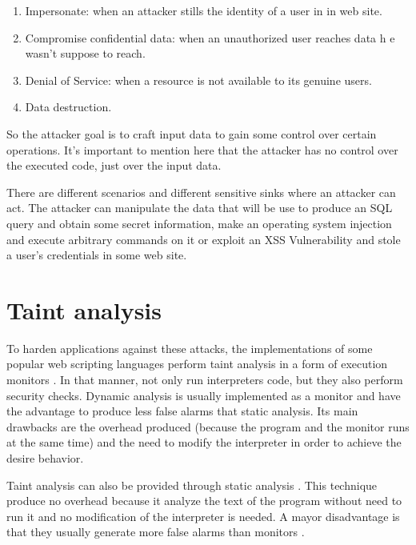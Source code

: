 \begin{enumerate}
\item Impersonate: when an attacker stills the identity of a user
in in web site.
\item Compromise confidential data: when an unauthorized user
reaches data h
e wasn't suppose to reach.
\item Denial of Service: when a resource is not available
to its genuine users.
\item Data destruction.
\end{enumerate}

So the attacker goal is to craft input data to gain some
control over certain operations.
It's important to mention here that the attacker has no
control over the executed code,
just over the input data.

There are different scenarios and different sensitive sinks
where an attacker can act.
The attacker can  manipulate the data that will be use
to produce an SQL query
and obtain some secret information,
make an operating system injection and execute
arbitrary commands on it or exploit an XSS Vulnerability
and stole a user's credentials
in some web site.

\section*{Taint analysis}
To harden applications against these attacks, 
the implementations of some popular web scripting languages 
perform taint analysis in a form 
of execution monitors \cite{Perl,Ruby}. In that manner,
not only run interpreters code, but they also perform
security checks.
Dynamic analysis is usually implemented as a monitor and have the advantage
to produce less false alarms that static analysis. Its main drawbacks are
the overhead produced (because the program and the monitor
runs at the same time)
and the need to modify the interpreter in order to
achieve the desire behavior.

Taint analysis can also be provided through static analysis
\cite{WebSSARI,Jovanovic06pixy:a}. 
This technique produce no overhead because it analyze
the text of the program without need to run it
and no modification of the interpreter is needed.
A mayor disadvantage is that they usually generate
more false alarms than monitors
\cite{Sabelfeld:Russo:PSI09}. 

